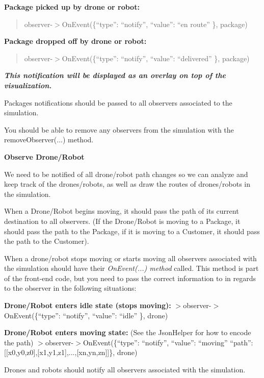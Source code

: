\begin{DoxyEnumerate}
\begin{DoxyItemize}
\begin{DoxyItemize}
\item {\bfseries Package picked up by drone or robot\+:} \begin{quote}
observer-\/$>$On\+Event(\{“type”\+: “notify”, “value”\+: “en route” \}, package) \end{quote}

\item {\bfseries Package dropped off by drone or robot\+:} \begin{quote}
observer-\/$>$On\+Event(\{“type”\+: “notify”, “value”\+: “delivered” \}, package) \end{quote}

\item {\itshape {\bfseries This notification will be displayed as an overlay on top of the visualization.}}
\item Packages\textquotesingle{} notifications should be passed to all observers associated to the simulation.
\item You should be able to remove any observers from the simulation with the remove\+Observer(...) method.
\end{DoxyItemize}
\end{DoxyItemize}
\item {\bfseries Observe Drone/\+Robot}
\begin{DoxyItemize}
\item We need to be notified of all drone/robot path changes so we can analyze and keep track of the drones/robots, as well as draw the routes of drones/robots in the simulation.
\item When a Drone/\+Robot begins moving, it should pass the path of its current destination to all observers. (If the Drone/\+Robot is moving to a Package, it should pass the path to the Package, if it is moving to a Customer, it should pass the path to the Customer).
\item When a drone/robot stops moving or starts moving all observers associated with the simulation should have their {\itshape On\+Event(...) method} called. This method is part of the front-\/end code, but you need to pass the correct information to in regards to the observer in the following situations\+:
\begin{DoxyItemize}
\item {\bfseries Drone/\+Robot enters idle state (stops moving)\+:} $>$observer-\/$>$On\+Event(\{“type”\+: “notify”, “value”\+: “idle” \}, drone)
\item {\bfseries Drone/\+Robot enters moving state\+:} (See the Json\+Helper for how to encode the path) $>$observer-\/$>$On\+Event(\{“type”\+: “notify”, “value”\+: “moving” “path”\+:\mbox{[}\mbox{[}x0,y0,z0\mbox{]},\mbox{[}x1,y1,z1\mbox{]},...,\mbox{[}xn,yn,zn\mbox{]}\mbox{]}\}, drone)
\item Drones and robots should notify all observers associated with the simulation.
\end{DoxyItemize}
\end{DoxyItemize}
\end{DoxyEnumerate}

